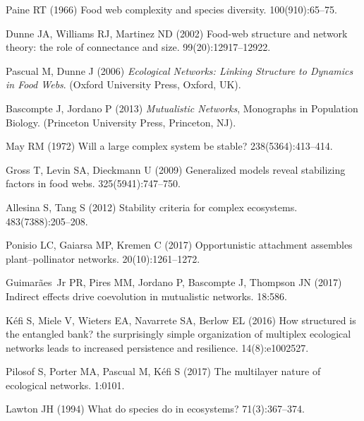 \documentclass[twocolumn,preprintnumbers,amsmath,amssymb,superscriptaddress]{revtex4}
\begin{document}
% 

\begin{thebibliography}{10}

Paine RT (1966) Food web complexity and species diversity.
 100(910):65--75.

Dunne JA, Williams RJ, Martinez ND (2002) Food-web structure and network
  theory: the role of connectance and size.
 99(20):12917--12922.

Pascual M, Dunne J (2006) {\em Ecological Networks: Linking Structure to
  Dynamics in Food Webs}.
\newblock (Oxford University Press, Oxford, UK).

Bascompte J, Jordano P (2013) {\em Mutualistic Networks}, Monographs in
  Population Biology.
\newblock (Princeton University Press, Princeton, NJ).

May RM (1972) {Will a large complex system be stable?}
 238(5364):413--414.

Gross T, Levin SA, Dieckmann U (2009) Generalized models reveal stabilizing
  factors in food webs.
 325(5941):747--750.

Allesina S, Tang S (2012) {Stability criteria for complex ecosystems}.
 483(7388):205--208.

Ponisio LC, Gaiarsa MP, Kremen C (2017) Opportunistic attachment assembles
  plant–pollinator networks.
 20(10):1261--1272.

Guimar{\~a}es~Jr PR, Pires MM, Jordano P, Bascompte J, Thompson JN (2017)
  {Indirect effects drive coevolution in mutualistic networks}.
 18:586.

K{\'e}fi S, Miele V, Wieters EA, Navarrete SA, Berlow EL (2016) How structured
  is the entangled bank? the surprisingly simple organization of multiplex
  ecological networks leads to increased persistence and resilience.
 14(8):e1002527.

Pilosof S, Porter MA, Pascual M, K{\'e}fi S (2017) The multilayer nature of
  ecological networks.
 1:0101.

Lawton JH (1994) What do species do in ecosystems?
 71(3):367--374.


\end{thebibliography}
\end{document}
